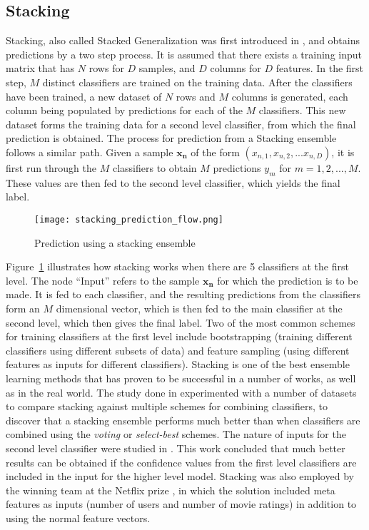 \subsection{Stacking}
Stacking, also called Stacked Generalization was first introduced in \cite{wolpert1992stacked}, and obtains predictions by a two step process. It is assumed that there exists a training input matrix that has $N$ rows for $D$ samples, and $D$ columns for $D$ features. In the first step, $M$ distinct classifiers are trained on the training data. After the classifiers have been trained, a new dataset of $N$ rows and $M$ columns is generated, each column being populated by predictions for each of the $M$ classifiers. This new dataset forms the training data for a second level classifier, from which the final prediction is obtained. The process for prediction from a Stacking ensemble follows a similar path. Given a sample $\mathbf{x_n}$ of the form $(x_{n, 1}, x_{n, 2}, ... x_{n, D})$, it is first run through the $M$ classifiers to obtain $M$ predictions $y_m$ for $m = 1, 2, ..., M$. These values are then fed to the second level classifier, which yields the final label.\\

\begin{figure}
    \centering
    \texttt{[image: stacking\_prediction\_flow.png]}
    \caption{Prediction using a stacking ensemble}
    \label{fig:stacking_prediction_flow}
\end{figure}

Figure~\ref{fig:stacking_prediction_flow} illustrates how stacking works when there are 5 classifiers at the first level. The node ``Input'' refers to the sample $\mathbf{x_n}$ for which the prediction is to be made. It is fed to each classifier, and the resulting predictions from the classifiers form an $M$ dimensional vector, which is then fed to the main classifier at the second level, which then gives the final label. Two of the most common schemes for training classifiers at the first level include bootstrapping (training different classifiers using different subsets of data) and feature sampling (using different features as inputs for different classifiers). Stacking is one of the best ensemble learning methods that has proven to be successful in a number of works, as well as in the real world. The study done in \cite{dvzeroski2004combining} experimented with a number of datasets to compare stacking against multiple schemes for combining classifiers, to discover that a stacking ensemble performs much better than when classifiers are combined using the \emph{voting} or \emph{select-best} schemes. The nature of inputs for the second level classifier were studied in \cite{ting2011issues}. This work concluded that much better results can be obtained if the confidence values from the first level classifiers are included in the input for the higher level model. Stacking was also employed by the winning team at the Netflix prize \cite{koren2009bellkor}, in which the solution included meta features as inputs (number of users and number of movie ratings) in addition to using the normal feature vectors.
